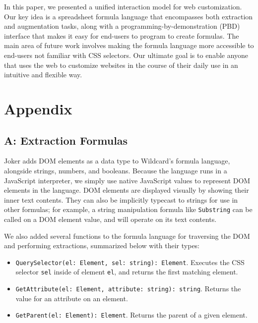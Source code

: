 \documentclass[sigconf,10pt]{acmart}
\providecommand{\tightlist}{%
  \setlength{\itemsep}{0pt}\setlength{\parskip}{0pt}}
\begin{document}
In this paper, we presented a unified interaction model for web
customization. Our key idea is a spreadsheet formula language that
encompasses both extraction and augmentation tasks, along with a
programming-by-demonstration (PBD) interface that makes it easy for
end-users to program to create formulas. The main area of future work
involves making the formula language more accessible to end-users not
familiar with CSS selectors. Our ultimate goal is to enable anyone that
uses the web to customize websites in the course of their daily use in
an intuitive and flexible way.

\newpage





\clearpage
\hypertarget{appendix}{%
\section*{Appendix}\label{appendix}}

\hypertarget{appendix-a}{%
\subsection*{A: Extraction Formulas}\label{appendix-a}}

Joker adds DOM elements as a data type to Wildcard's formula language, alongside strings,
numbers, and booleans. Because the language runs in a JavaScript
interpreter, we simply use native JavaScript values to represent DOM
elements in the language. DOM elements are displayed visually by showing
their inner text contents. They can also be implicitly typecast to
strings for use in other formulas; for example, a string manipulation
formula like \texttt{Substring} can be called on a DOM element value,
and will operate on its text contents.

We also added several functions to the formula language for traversing
the DOM and performing extractions, summarized below with their types:

\begin{itemize}
\tightlist
\item
  \texttt{QuerySelector(el:\ Element,\ sel:\ string):\ Element}.
  Executes the CSS selector \texttt{sel} inside of element \texttt{el},
  and returns the first matching element.
\item
  \texttt{GetAttribute(el:\ Element,\ attribute:\ string):\ string}.
  Returns the value for an attribute on an element.
\item
  \texttt{GetParent(el:\ Element):\ Element}. Returns the parent of a
  given element.
\end{itemize}
\end{document}
